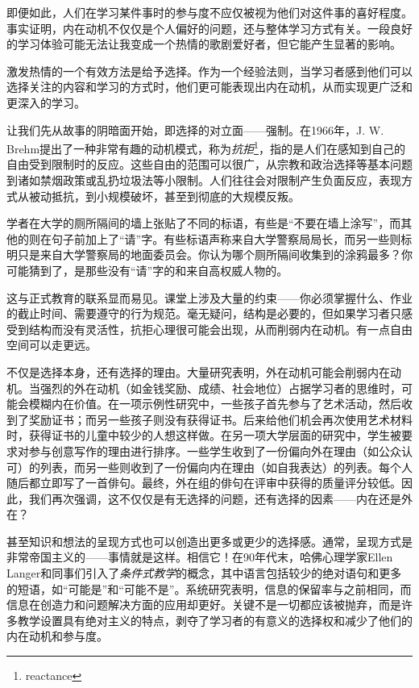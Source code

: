 即便如此，人们在学习某件事时的参与度不应仅被视为他们对这件事的喜好程度。事实证明，内在动机不仅仅是个人偏好的问题，还与整体学习方式有关。一段良好的学习体验可能无法让我变成一个热情的歌剧爱好者，但它能产生显著的影响。

激发热情的一个有效方法是给予选择。作为一个经验法则，当学习者感到他们可以选择关注的内容和学习的方式时，他们更可能表现出内在动机，从而实现更广泛和更深入的学习。

让我们先从故事的阴暗面开始，即选择的对立面——强制。在1966年，J. W. Brehm提出了一种非常有趣的动机模式，称为\textit{抗拒}\footnote{reactance}，指的是人们在感知到自己的自由受到限制时的反应。这些自由的范围可以很广，从宗教和政治选择等基本问题到诸如禁烟政策或乱扔垃圾法等小限制。人们往往会对限制产生负面反应，表现方式从被动抵抗，到小规模破坏，甚至到彻底的大规模反叛。

学者在大学的厕所隔间的墙上张贴了不同的标语，有些是“不要在墙上涂写”，而其他的则在句子前加上了“请”字。有些标语声称来自大学警察局局长，而另一些则标明只是来自大学警察局的地面委员会。你认为哪个厕所隔间收集到的涂鸦最多？你可能猜到了，是那些没有“请”字的和来自高权威人物的。

这与正式教育的联系显而易见。课堂上涉及大量的约束——你必须掌握什么、作业的截止时间、需要遵守的行为规范。毫无疑问，结构是必要的，但如果学习者只感受到结构而没有灵活性，抗拒心理很可能会出现，从而削弱内在动机。有一点自由空间可以走更远。

不仅是选择本身，还有选择的理由。大量研究表明，外在动机可能会削弱内在动机。当强烈的外在动机（如金钱奖励、成绩、社会地位）占据学习者的思维时，可能会模糊内在价值。在一项示例性研究中，一些孩子首先参与了艺术活动，然后收到了奖励证书；而另一些孩子则没有获得证书。后来给他们机会再次使用艺术材料时，获得证书的儿童中较少的人想这样做。在另一项大学层面的研究中，学生被要求对参与创意写作的理由进行排序。一些学生收到了一份偏向外在理由（如公众认可）的列表，而另一些则收到了一份偏向内在理由（如自我表达）的列表。每个人随后都立即写了一首俳句。最终，外在组的俳句在评审中获得的质量评分较低。因此，我们再次强调，这不仅仅是有无选择的问题，还有选择的因素——内在还是外在？

甚至知识和想法的呈现方式也可以创造出更多或更少的选择感。通常，呈现方式是非常帝国主义的——事情就是这样。相信它！在90年代末，哈佛心理学家Ellen Langer和同事们引入了\textit{条件式教学}的概念，其中语言包括较少的绝对语句和更多的短语，如“可能是”和“可能不是”。系统研究表明，信息的保留率与之前相同，而信息在创造力和问题解决方面的应用却更好。关键不是一切都应该被抛弃，而是许多教学设置具有绝对主义的特点，剥夺了学习者的有意义的选择权和减少了他们的内在动机和参与度。

